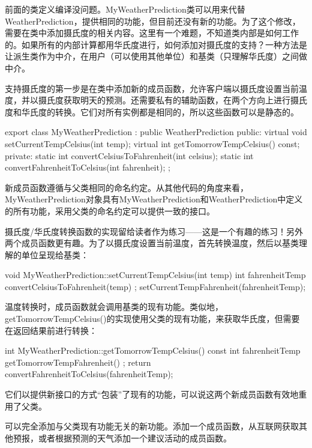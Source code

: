 前面的类定义编译没问题。MyWeatherPrediction类可以用来代替WeatherPrediction，提供相同的功能，但目前还没有新的功能。为了这个修改，需要在类中添加摄氏度的相关内容。这里有一个难题，不知道类内部是如何工作的。如果所有的内部计算都用华氏度进行，如何添加对摄氏度的支持？一种方法是让派生类作为中介，在用户（可以使用其他单位）和基类（只理解华氏度）之间做中介。

支持摄氏度的第一步是在类中添加新的成员函数，允许客户端以摄氏度设置当前温度，并以摄氏度获取明天的预测。还需要私有的辅助函数，在两个方向上进行摄氏度和华氏度的转换。它们对所有实例都是相同的，所以这些函数可以是静态的。

\begin{cpp}
export class MyWeatherPrediction : public WeatherPrediction
{
    public:
        virtual void setCurrentTempCelsius(int temp);
        virtual int getTomorrowTempCelsius() const;
    private:
        static int convertCelsiusToFahrenheit(int celsius);
        static int convertFahrenheitToCelsius(int fahrenheit);
};
\end{cpp}

新成员函数遵循与父类相同的命名约定。从其他代码的角度来看，MyWeatherPrediction对象具有MyWeatherPrediction和WeatherPrediction中定义的所有功能，采用父类的命名约定可以提供一致的接口。

摄氏度/华氏度转换函数的实现留给读者作为练习——这是一个有趣的练习！另外两个成员函数更有趣。为了以摄氏度设置当前温度，首先转换温度，然后以基类理解的单位呈现给基类：

\begin{cpp}
void MyWeatherPrediction::setCurrentTempCelsius(int temp)
{
    int fahrenheitTemp { convertCelsiusToFahrenheit(temp) };
    setCurrentTempFahrenheit(fahrenheitTemp);
}
\end{cpp}

温度转换时，成员函数就会调用基类的现有功能。类似地，getTomorrowTempCelsius()的实现使用父类的现有功能，来获取华氏度，但需要在返回结果前进行转换：

\begin{cpp}
int MyWeatherPrediction::getTomorrowTempCelsius() const
{
    int fahrenheitTemp { getTomorrowTempFahrenheit() };
    return convertFahrenheitToCelsius(fahrenheitTemp);
}
\end{cpp}

它们以提供新接口的方式“包装”了现有的功能，可以说这两个新成员函数有效地重用了父类。

可以完全添加与父类现有功能无关的新功能。添加一个成员函数，从互联网获取其他预报，或者根据预测的天气添加一个建议活动的成员函数。

